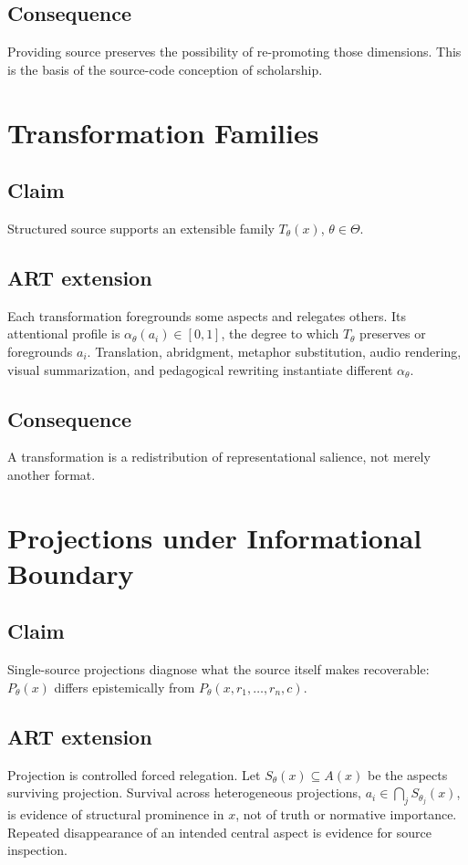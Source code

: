 \documentclass[11pt,openany]{book}
\begin{document}
\section{Consequence}
Providing source preserves the possibility of re-promoting those
dimensions. This is the basis of the source-code conception of scholarship.

\chapter{Transformation Families}
\section{Claim}
Structured source supports an extensible family $T_\theta(x)$,
$\theta\in\Theta$.
\section{ART extension}
Each transformation foregrounds some aspects and relegates others. Its
attentional profile is $\alpha_\theta(a_i)\in[0,1]$, the degree to which
$T_\theta$ preserves or foregrounds $a_i$. Translation, abridgment,
metaphor substitution, audio rendering, visual summarization, and
pedagogical rewriting instantiate different $\alpha_\theta$.
\section{Consequence}
A transformation is a redistribution of representational salience, not
merely another format.

\chapter{Projections under Informational Boundary}
\section{Claim}
Single-source projections diagnose what the source itself makes
recoverable: $P_\theta(x)$ differs epistemically from
$P_\theta(x,r_1,\ldots,r_n,c)$.
\section{ART extension}
Projection is controlled forced relegation. Let $S_\theta(x)\subseteq A(x)$
be the aspects surviving projection. Survival across heterogeneous
projections, $a_i\in\bigcap_j S_{\theta_j}(x)$, is evidence of structural
prominence in $x$, not of truth or normative importance. Repeated
disappearance of an intended central aspect is evidence for source
inspection.
\end{document}
